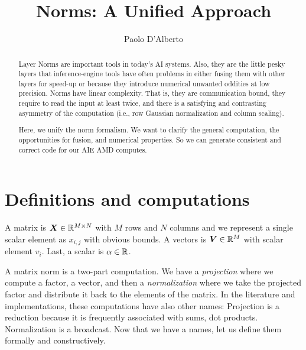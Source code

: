 \documentclass[acmsmall]{acmart}
\begin{document}
\title{Norms: A Unified Approach}

\author{Paolo D'Alberto}
\email{}

\renewcommand{\shortauthors}{D'Alberto et al.}

\begin{abstract}

  Layer Norms are important tools in today's AI systems.  Also, they
  are the little pesky layers that inference-engine tools have often
  problems in either fusing them with other layers for speed-up or
  because they introduce numerical unwanted oddities at low precision.
  Norms have linear complexity. That is, they are communication bound,
  they require to read the input at least twice, and there is a
  satisfying and contrasting asymmetry of the computation (i.e., row
  Gaussian normalization and column scaling).
  
  Here, we unify the norm formalism. We want to clarify the general
  computation, the opportunities for fusion, and numerical
  properties. So we can generate consistent and correct code for our
  AIE AMD computes.
  
\end{abstract}

\maketitle

\section{Definitions and computations } 
\label{sec:introduction}

A matrix is ${\boldsymbol X} \in \mathbb{R}^{M \times N}$ with $M$ rows and $N$ columns
and we represent a single scalar element as $x_{i,j}$ with obvious
bounds. A vectors is ${\boldsymbol V} \in \mathbb{R}^{M}$ with scalar element $v_i$.
Last, a scalar is $\alpha \in \mathbb{R}$.


A matrix norm is a two-part computation. We have a {\em projection}
where we compute a factor, a vector, and then a {\em normalization}
where we take the projected factor and distribute it back to the
elements of the matrix. In the literature and implementations, these
computations have also other names: Projection is a reduction because
it is frequently associated with sums, dot products. Normalization is
a broadcast. Now that we have a names, let us define them formally and
constructively.
\end{document}
